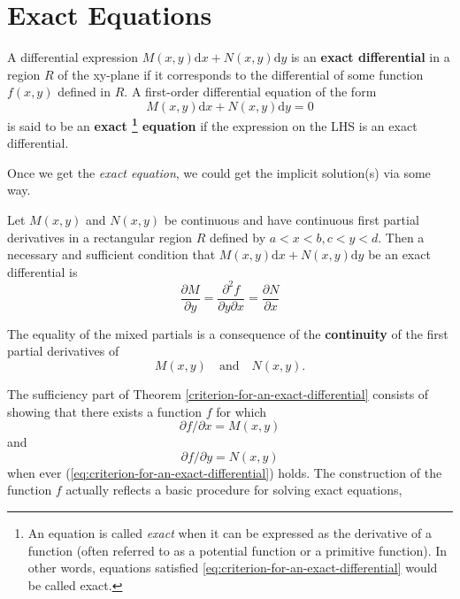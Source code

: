 \section{Exact Equations}

\begin{definition} \label{def:exact-equation}
    A differential expression $M(x, y) \mathrm{d}x + N(x, y) \mathrm{d}y$
    is an \textbf{exact differential} in a region $R$ of the 
    xy-plane if it corresponds to the differential of some function
    $f (x, y)$ defined in $R$. 
    A first-order differential equation of the form
    \[
        M(x, y) \mathrm{d}x + N(x, y) \mathrm{d}y = 0
    \]
    is said to be an 
    \textbf{
        exact
        \footnote{
            An equation is called \emph{exact}
            when it can be expressed as 
            the derivative of a function 
            (often referred to as a potential function 
            or a primitive function). 
            In other words, equations satisfied \ref{eq:criterion-for-an-exact-differential}
            would be called exact.
        } equation
    } if the expression on the 
    LHS is an exact differential.
    \cite[page 65]{fcde}
\end{definition}

Once we get the \emph{exact equation}, 
we could get the implicit solution(s)
via some way.

\begin{theorem}
    \label{criterion-for-an-exact-differential}
    Let $M(x, y)$ and $N(x, y)$ be continuous and 
    have continuous first partial derivatives 
    in a rectangular region $R$ defined by $a < x < b, c < y < d$. 
    Then a necessary and sufficient condition that 
    $M(x, y) \mathrm{d}x + N(x, y) \mathrm{d}y$ be an exact
    differential is
    \begin{equation}\label{eq:criterion-for-an-exact-differential}
        \dfrac{\partial M}{\partial y} = \dfrac{\partial^2 f}{\partial y \partial x} = \dfrac{\partial N}{\partial x}  
    \end{equation}
\end{theorem}
 
The equality of the mixed partials is a consequence of 
the \textbf{continuity} of the first partial derivatives of 
\[
    M(x, y) \quad \mbox{and} \quad N(x, y).
\]

The sufficiency part of Theorem \ref{criterion-for-an-exact-differential} 
consists of showing that there exists a function $f$ for which
\[\partial f/ \partial x = M(x, y)\] and \[\partial f/ \partial y = N(x, y)\]
when ever (\ref{eq:criterion-for-an-exact-differential}) holds.
The construction of the function $f$ actually reflects a basic procedure
for solving exact equations,

